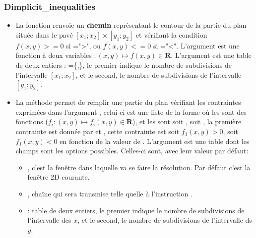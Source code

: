 \subsubsection{Dimplicit\_inequalities}

\begin{itemize}
    \item La fonction  renvoie un \textbf{chemin} représentant le contour de la partie du plan située dans le pavé $[x_1;x_2]\times[y_1;y_2]$ et vérifiant la condition $f(x,y)>=0$ si =">", ou $f(x,y)<=0$ si ="<". L'argument  est une fonction à deux variables $\colon (x,y)\mapsto f(x,y)\in \mathbf R$. L'argument  est une table de deux entiers : =\{,\}, le premier indique le nombre de subdivisions de l'intervalle $[x_1;x_2]$, et le second, le nombre de subdivisions de l'intervalle $[y_1;y_2]$. 
 
    \item La méthode  permet de remplir une partie du plan vérifiant les contraintes exprimées dans l'argument , celui-ci est une liste de la forme  où les  sont des fonctions ($f_i\colon (x,y) \mapsto f_i(x,y)\in \mathbf R$), et les  sont soit , soit , la première contrainte est donnée par  et , cette contrainte est soit $f_1(x,y)>0$, soit $f_1(x,y)<0$ en fonction de la valeur de . L'argument  est une table dont les champs sont les options possibles. Celles-ci sont, avec leur valeur par défaut:
    
  \begin{itemize}
      \item {}, c'est la fenêtre dans laquelle va se faire la résolution. Par défaut c'est la fenêtre 2D courante.
      
      \item {}, chaîne qui sera transmise telle quelle à l'instruction \drawcmd.
      
      \item {} : table de deux entiers, le premier indique le nombre de subdivisions de l'intervalle des $x$, et le second, le nombre de subdivisions de l'intervalle ds $y$.
  \end{itemize}
\end{itemize}

